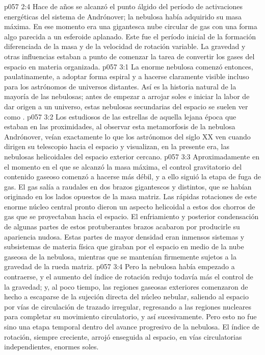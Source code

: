 \vs p057 2:4 \pc Hace  de años se alcanzó el punto álgido del período de activaciones energéticas del sistema de Andrónover; la nebulosa había adquirido su masa máxima. En ese momento era una gigantesca nube circular de gas con una forma algo parecida a un esferoide aplanado. Este fue el período inicial de la formación diferenciada de la masa y de la velocidad de rotación variable. La gravedad y otras influencias estaban a punto de comenzar la tarea de convertir los gases del espacio en materia organizada.
\vs p057 3:1 La enorme nebulosa comenzó entonces, paulatinamente, a adoptar forma espiral y a hacerse claramente visible incluso para los astrónomos de universos distantes. Así es la historia natural de la mayoría de las nebulosas; antes de empezar a arrojar soles e iniciar la labor de dar origen a un universo, estas nebulosas secundarias del espacio se suelen ver como .
\vs p057 3:2 Los estudiosos de las estrellas de aquella lejana época que estaban en las proximidades, al observar esta metamorfosis de la nebulosa Andrónover, veían exactamente lo que los astrónomos del siglo XX ven cuando dirigen su telescopio hacia el espacio y visualizan, en la presente era, las nebulosas helicoidales del espacio exterior cercano.
\vs p057 3:3 Aproximadamente en el momento en el que se alcanzó la masa máxima, el control gravitatorio del contenido gaseoso comenzó a hacerse más débil, y a ello siguió la etapa de fuga de gas. El gas salía a raudales en dos brazos gigantescos y distintos, que se habían originado en los lados opuestos de la masa matriz. Las rápidas rotaciones de este enorme núcleo central pronto dieron un aspecto helicoidal a estos dos chorros de gas que se proyectaban hacia el espacio. El enfriamiento y posterior condensación de algunas partes de estos protuberantes brazos acabaron por producirle su apariencia nudosa. Estas partes de mayor densidad eran inmensos sistemas y subsistemas de materia física que giraban por el espacio en medio de la nube gaseosa de la nebulosa, mientras que se mantenían firmemente sujetos a la gravedad de la rueda matriz.
\vs p057 3:4 Pero la nebulosa había empezado a contraerse, y el aumento del índice de rotación redujo todavía más el control de la gravedad; y, al poco tiempo, las regiones gaseosas exteriores comenzaron de hecho a escaparse de la sujeción directa del núcleo nebular, saliendo al espacio por vías de circulación de trazado irregular, regresando a las regiones nucleares para completar su movimiento circulatorio, y así sucesivamente. Pero esto no fue sino una etapa temporal dentro del avance progresivo de la nebulosa. El índice de rotación, siempre creciente, arrojó enseguida al espacio, en vías circulatorias independientes, enormes soles.
